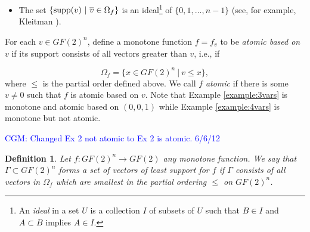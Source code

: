 \documentclass[12pt]{article}
\def\blue#1{\textcolor{blue}{#1}}
\newcommand{\cgm}[1]{\blue{CGM: #1}}
\newtheorem{definition}[theorem]{Definition}
\newcommand{\Sum}{\sum\limits}
\begin{document}
\begin{itemize}
\begin{proof}
    To see that the support is injective, note that two different
    Boolean functions have different supports. To see that the support
    is surjective, let $C \subseteq GF(2)^n$ be a given closure in
    $D_n$ and define $f_C$ as the function with $C$ as a set of
    support vectors, i.e., for all $v \in C$, $f_C(v) = 1$. We claim
    that $f_C$ is monotone.  Let $v, w \in GF(2)^n$ be given where $v
    \leq w$ and $v\not=w$. If $f_C(v) = 0$ then $f_C(v) \leq f_C(w)$,
    trivially, so assume that $f_C(v)=1$, i.e., $v \in C$. Note that
    if $v \leq w$ and $v\not=w$ then for some positive integer $k$,
    there are $k$ components where $v$ has a zero and $w$ has a one.
    For $i \in \{0,\ldots,2^n-1\}$, let $e_i$ denote the vector with
    one in component $i$ and zero in all other components. Then there
    is a set $\{i_1,\ldots,i_k\} \subset \{0,\ldots,2^n-1\}$ where $w
    = v+\Sum_{j=1}^k e_j$. For $\ell \in \{0,\ldots,k\}$, let $u_\ell
    = v+ \Sum_{j=1}^\ell e_j$. By the definition of the Hesse diagram,
    for $\ell \in \{0,\ldots,k-1\}$, $(v_\ell,v_{\ell+1})$ are edges
    in $D_n$. Then, as $v=v_0 \in C$, by the closure property, $v_\ell
    \in C$ for all $\ell \in \{0,\ldots,k\}$, so, in particular,
    $f_C(w) = f_C(v_k) = 1 \geq f_C(v)$.

  \end{proof}

\item The set $\{{\rm supp}(v)\ |\ \overline{v}\in\Omega_f\}$ is an
  ideal\footnote{ An {\it ideal} in a set $U$ is a collection $I$ of
    subsets of $U$ such that $B\in I$ and $A\subset B$ implies $A\in
    I$.  } of ${\{0,1,\dots,n-1\}}$ (see, for example, Kleitman
  \cite{art:k69}).

\end{itemize}

For each $v\in GF(2)^n$,
define a monotone function $f=f_v$ to be
{\it atomic based on $v$} if its support
consists of all vectors greater than $v$,
i.e., if

\[
\Omega_f = \{x\in GF(2)^n \ |\ v\leq x\},
\]
where $\leq$ is the partial order defined above.
We call $f$ {\it atomic} if there is some
$v\not= 0$ such that $f$ is atomic based on $v$.
Note that Example \ref{example:3vars} is 
monotone and atomic based on $(0,0,1)$ while Example 
\ref{example:4vars} is monotone but not atomic.

\cgm{Changed Ex 2 not atomic to Ex 2 is atomic. 6/6/12}

\begin{definition}
\label{def:leastsupport}
{\rm
Let $f:GF(2)^n \to GF(2)$ any monotone function.
We say that $\Gamma\subset GF(2)^n$ forms a set of vectors of
{\it least support} for $f$ if $\Gamma$ consists of all
vectors in $\Omega_f$ which are smallest in the
partial ordering $\leq$ on $GF(2)^n$.
}
\end{definition}
\end{document}
